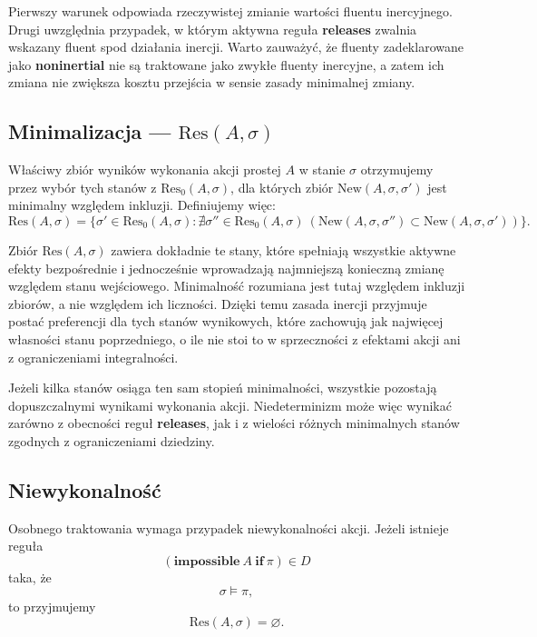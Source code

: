 \documentclass[11pt,a4paper]{article}
\theoremstyle{definition}
\begin{document}
Pierwszy warunek odpowiada rzeczywistej zmianie wartości fluentu inercyjnego. Drugi uwzględnia przypadek, w którym aktywna reguła \textbf{releases} zwalnia wskazany fluent spod działania inercji. Warto zauważyć, że fluenty zadeklarowane jako \textbf{noninertial} nie są traktowane jako zwykłe fluenty inercyjne, a zatem ich zmiana nie zwiększa kosztu przejścia w sensie zasady minimalnej zmiany.

\subsection{Minimalizacja --- \texorpdfstring{$\mathrm{Res}(A, \sigma)$}{Res(A,sigma)}}
\label{sec:minimalizacja}

Właściwy zbiór wyników wykonania akcji prostej $A$ w stanie $\sigma$ otrzymujemy przez wybór tych stanów z $\mathrm{Res}_0(A,\sigma)$, dla których zbiór $\mathrm{New}(A,\sigma,\sigma')$ jest minimalny względem inkluzji. Definiujemy więc:
\[
\mathrm{Res}(A,\sigma)=
\{\sigma' \in \mathrm{Res}_0(A,\sigma) :
\nexists \sigma'' \in \mathrm{Res}_0(A,\sigma)\ 
(\mathrm{New}(A,\sigma,\sigma'') \subset \mathrm{New}(A,\sigma,\sigma'))\}.
\]

Zbiór $\mathrm{Res}(A,\sigma)$ zawiera dokładnie te stany, które spełniają wszystkie aktywne efekty bezpośrednie i jednocześnie wprowadzają najmniejszą konieczną zmianę względem stanu wejściowego. Minimalność rozumiana jest tutaj względem inkluzji zbiorów, a nie względem ich liczności. Dzięki temu zasada inercji przyjmuje postać preferencji dla tych stanów wynikowych, które zachowują jak najwięcej własności stanu poprzedniego, o ile nie stoi to w sprzeczności z efektami akcji ani z ograniczeniami integralności.

Jeżeli kilka stanów osiąga ten sam stopień minimalności, wszystkie pozostają dopuszczalnymi wynikami wykonania akcji. Niedeterminizm może więc wynikać zarówno z obecności reguł \textbf{releases}, jak i z wielości różnych minimalnych stanów zgodnych z ograniczeniami dziedziny.

\subsection{Niewykonalność}

Osobnego traktowania wymaga przypadek niewykonalności akcji. Jeżeli istnieje reguła
\[
(\textbf{impossible}\ A\ \textbf{if}\ \pi)\in D
\]
taka, że
\[
\sigma \models \pi,
\]
to przyjmujemy
\[
\mathrm{Res}(A,\sigma)=\varnothing.
\]
\end{document}
